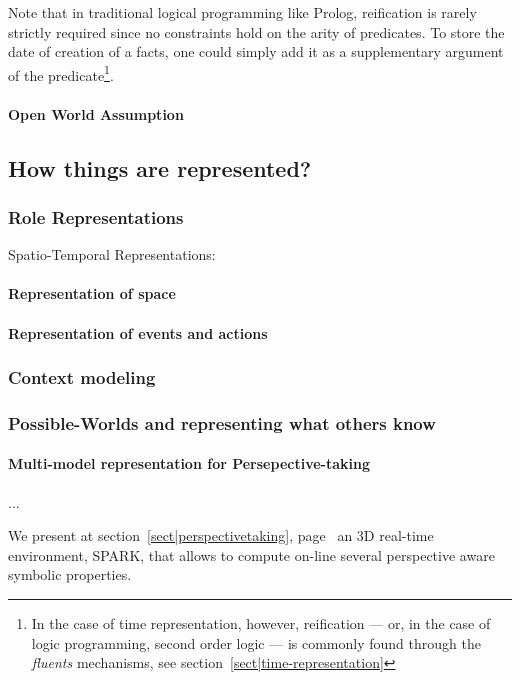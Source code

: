 Note that in traditional logical programming like Prolog, reification is rarely
strictly required since no constraints hold on the arity of predicates. To
store the date of creation of a facts, one could simply add it as a
supplementary argument of the predicate\footnote{In the case of time
representation, however, reification --- or, in the case of logic programming,
second order logic --- is commonly found through the \emph{fluents} mechanisms,
see section~\ref{sect|time-representation}}.

\paragraph{Open World Assumption}

\subsection{How things are represented?}
\subsubsection{Role Representations}
Spatio-Temporal Representations:

\paragraph{Representation of space}
\paragraph{Representation of events and actions}

\subsubsection{Context modeling}
\subsubsection{Possible-Worlds and representing what others know}

\paragraph{Multi-model representation for Persepective-taking}
\label{sect|alterite}

...

We present at section~\ref{sect|perspectivetaking},
page~\pageref{sect|perspectivetaking} an 3D real-time environment, SPARK, that
allows to compute on-line several perspective aware symbolic properties.

